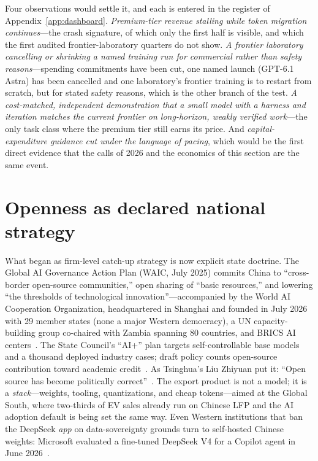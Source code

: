 Four observations would settle it, and each is entered in the register of Appendix~\ref{app:dashboard}. \emph{Premium-tier revenue stalling while token migration continues}---the crash signature, of which only the first half is visible, and which the first audited frontier-laboratory quarters do not show. \emph{A frontier laboratory cancelling or shrinking a named training run for commercial rather than safety reasons}---spending commitments have been cut, one named launch (GPT-6.1 Astra) has been cancelled and one laboratory's frontier training is to restart from scratch, but for stated safety reasons, which is the other branch of the test. \emph{A cost-matched, independent demonstration that a small model with a harness and iteration matches the current frontier on long-horizon, weakly verified work}---the only task class where the premium tier still earns its price. And \emph{capital-expenditure guidance cut under the language of pacing}, which would be the first direct evidence that the calls of 2026 and the economics of this section are the same event.

\section{Openness as declared national strategy}

What began as firm-level catch-up strategy is now explicit state doctrine. The Global AI Governance Action Plan (WAIC, July 2025) commits China to ``cross-border open-source communities,'' open sharing of ``basic resources,'' and lowering ``the thresholds of technological innovation''---accompanied by the World AI Cooperation Organization, headquartered in Shanghai and founded in July 2026 with 29 member states (none a major Western democracy), a UN capacity-building group co-chaired with Zambia spanning 80 countries, and BRICS AI centers~\cite{action-plan,carnegie-pivot,waico}. The State Council's ``AI+'' plan targets self-controllable base models and a thousand deployed industry cases; draft policy counts open-source contribution toward academic credit~\cite{ai-plus}. As Tsinghua's Liu Zhiyuan put it: ``Open source has become politically correct''~\cite{mittr-open}. The export product is not a model; it is a \emph{stack}---weights, tooling, quantizations, and cheap tokens---aimed at the Global South, where two-thirds of EV sales already run on Chinese LFP and the AI adoption default is being set the same way. Even Western institutions that ban the DeepSeek \emph{app} on data-sovereignty grounds turn to self-hosted Chinese weights: Microsoft evaluated a fine-tuned DeepSeek V4 for a Copilot agent in June 2026~\cite{atlantic-council}.

